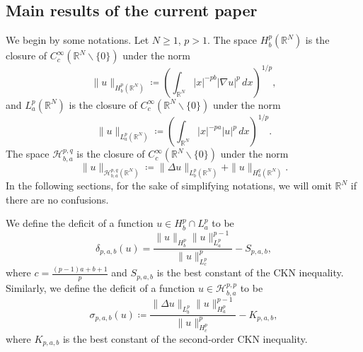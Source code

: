 \documentclass[11pt]{article}
\newcommand{\R}{\mathbb{R}}
\numberwithin{equation}{section}
\begin{document}
\vskip0.2in


\subsection{Main results of the current paper}
We begin by some notations. Let $N\ge 1$, $p>1$. The space $H^p_b(\R^N)$ is the closure of $C_c^\infty(\R^N\backslash\{0\})$ under the norm
$$ \|u\|_{H^p_b(\R^N)} \coloneqq \left(\int_{\R^N} |x|^{-pb}|\nabla u|^p\,dx\right)^{1/p}, $$
and $L^p_a(\R^N)$ is the closure of $C_c^\infty(\R^N\backslash\{0\})$ under the norm
\[ \|u\|_{L^p_a(\R^N)}\coloneqq\left(\int_{\R^N} |x|^{-pa}|u|^p\,dx\right)^{1/p}.\]
The space $\mathcal{H}_{b,a}^{p,q}$ is the closure of $C_c^\infty(\R^N\backslash\{0\})$ under the norm
\[ \|u\|_{\mathcal{H}_{b,a}^{p,q}(\R^N)} \coloneqq \|\Delta u\|_{L_b^p(\R^N)} + \|u\|_{H_a^q(\R^N)}.\]
In the following sections, for the sake of simplifying notations, we will omit $\R^N$ if there are no confusions.

We define the deficit of a function $u\in H^p_b\cap L^p_a$ to be
  \begin{equation}\label{ckn001} \delta_{p,a,b}(u)=\frac{\|u\|_{H_b^p}\|u\|_{L_a^p}^{p-1}}{\|u\|_{L_c^p}^p}-S_{p,a,b},   \end{equation}
where $c=\frac{(p-1)a+b+1}{p}$ and $S_{p,a,b}$ is the best constant of the CKN inequality. Similarly, we define the deficit of a function $u\in \mathcal{H}_{b,a}^{p,p}$ to be
  \begin{equation}\label{ckn002}\sigma_{p,a,b}(u) \coloneqq \frac{\|\Delta u\|_{L_b^p}\|u\|_{H_a^p}^{p-1}}{\|u\|_{H_c^p}^p} - K_{p,a,b}, \end{equation}
where $K_{p,a,b}$ is the best constant of the second-order CKN inequality.

\vskip0.12in
\end{document}

